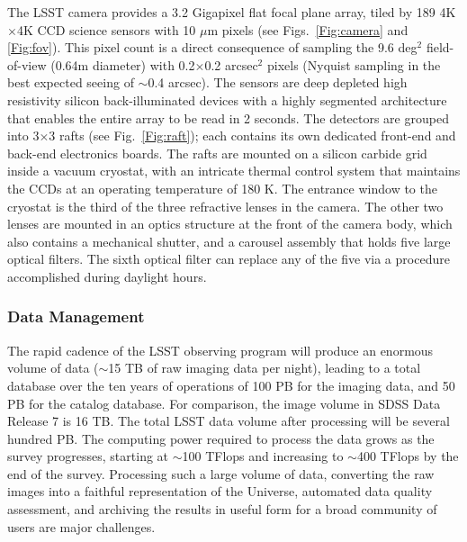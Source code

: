 \documentclass{emulateapj}
\begin{document}
The LSST camera provides a 3.2 Gigapixel flat focal plane array, tiled by 189
4K$\times$4K CCD science sensors with 10 $\mu$m pixels (see Figs.~\ref{Fig:camera}
and \ref{Fig:fov}). This pixel count is a direct consequence of sampling the 
9.6 deg$^2$ field-of-view (0.64m diameter) with 0.2$\times$0.2 arcsec$^2$
pixels (Nyquist sampling in the best expected seeing of $\sim$0.4 arcsec). 
The sensors are deep depleted high resistivity silicon back-illuminated devices with a highly segmented 
architecture that enables the entire array to be read in 2 seconds. 
The detectors are grouped into 3$\times$3 rafts (see Fig.~\ref{Fig:raft}); each 
contains its own dedicated front-end and back-end 
electronics boards. The rafts are mounted on a silicon carbide grid inside a 
vacuum cryostat, with an intricate thermal control system that maintains the
CCDs at an operating temperature of 180 K. The entrance window to the
cryostat is the third of the three refractive lenses in the camera. The other
two lenses are mounted in an optics structure at the front of the camera body, which 
also contains a mechanical shutter, and a carousel assembly that holds five
large optical filters. The sixth optical filter can 
replace any of the five via a procedure accomplished during daylight hours. 



\vskip 0.2in
\subsubsection{ Data Management }


The rapid cadence of the LSST observing program will produce an enormous
volume of data ($\sim$15 TB of raw imaging data per night), leading to a total database over 
the ten years of operations of 100 PB for the imaging data, and 50 PB for the catalog database. 
For comparison, the image volume in SDSS Data Release 7 is 16 TB. 
The total LSST data volume after processing will be several hundred PB.
The computing power required to process the data grows as the survey
progresses, starting at
 $\sim$100 TFlops and increasing to $\sim$400 TFlops by the end of the survey. Processing 
such a large volume of data, converting the raw images into a faithful
representation of the Universe, automated data quality assessment, and 
archiving the results in useful form for a broad community of users are
major challenges.
\end{document}
